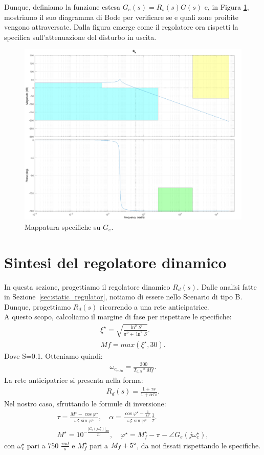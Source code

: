 \documentclass[a4paper, 11pt]{article}
\begin{document}
Dunque, definiamo la funzione estesa $G_e(s) = R_s(s)G(s)$ e, in Figura \ref{fig:G_e}, mostriamo il suo diagramma di Bode per verificare se e quali zone proibite vengono attraversate.
Dalla figura emerge come il regolatore ora rispetti la specifica sull'attenuazione del disturbo in uscita.

\begin{figure}[h!]
	\centering
	\includegraphics[width=0.75\linewidth]{./images/G_e.png}
	\caption{Mappatura specifiche su $G_e$.}
	\label{fig:G_e}
\end{figure}

\section{Sintesi del regolatore dinamico}
\label{sec:dynamic_regulator}

In questa sezione, progettiamo il regolatore dinamico $R_d(s)$. 
%
Dalle analisi fatte in Sezione~\ref{sec:static_regulator}, notiamo di essere nello Scenario di tipo B. Dunque, progettiamo $R_d(s)$ ricorrendo a una rete anticipatrice.\\
A questo scopo, calcoliamo il margine di fase per rispettare le specifiche:
\begin{align}
	\xi^{\star} = \sqrt{\frac{\ln^2{S}}{\pi^2 + \ln^2{S}}}.
	\\[0.5em]
	Mf = max (\xi^{\star}, 30).
\end{align}
Dove S=0.1. Otteniamo quindi:
\begin{align}
	\omega_{c_{min}}=\frac{300}{T_{a, 5}*Mf}.
\end{align}
La rete anticipatrice si presenta nella forma:
\begin{align}
	R_d(s) = \frac{1+\tau s}{1+\alpha \tau s}.
\end{align}
Nel nostro caso, sfruttando le formule di inversione:
\begin{align}
	\tau = \frac{M^{\star}-\cos{\varphi^{\star}}}{\omega_c^{\star}\sin{\varphi^{\star}}}, \quad
	\alpha = \frac{\cos{\varphi^{\star}-\frac{1}{M^{\star}}}}{\omega_c^{\star}\sin{\varphi^{\star}}}\frac{1}{\tau}.
	\\[1em]
	M^{\star} = 10^{-\frac{\left|G_e(j\omega_c^{\star})\right|_{dB}}{20}}, \quad
	\varphi^{\star} = M_f^{\star} -\pi - \angle{G_e(j\omega_c^{\star})},
\end{align}
con $\omega_c^{\star}$ pari a 750 $\frac{rad}{s}$ e $M_f^{\star}$ pari a $M_f + 5 \degree $, da noi fissati rispettando le specifiche.\\
\end{document}

